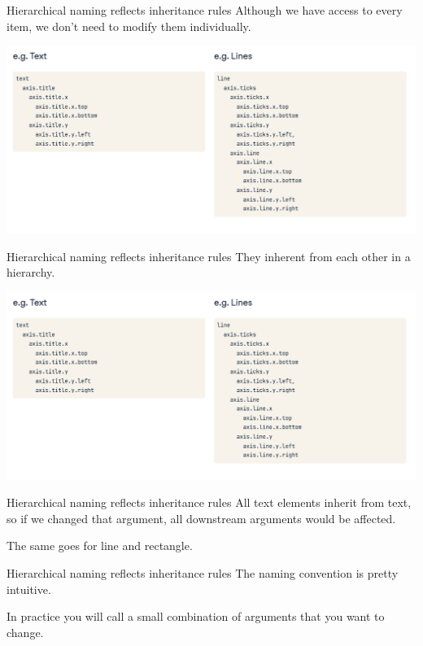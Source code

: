\documentclass[
  ignorenonframetext,
]{beamer}
\begin{document}
\begin{frame}{Hierarchical naming reflects inheritance rules}
\label{hierarchical-naming-reflects-inheritance-rules}
Although we have access to every item, we don't need to modify them
individually.

\includegraphics{../images/im215.png}
\end{frame}

\begin{frame}{Hierarchical naming reflects inheritance rules}
\label{hierarchical-naming-reflects-inheritance-rules-1}
They inherent from each other in a hierarchy.

\includegraphics{../images/im215.png}
\end{frame}

\begin{frame}{Hierarchical naming reflects inheritance rules}
\label{hierarchical-naming-reflects-inheritance-rules-2}
All text elements inherit from text, so if we changed that argument, all
downstream arguments would be affected.

The same goes for line and rectangle.
\end{frame}

\begin{frame}{Hierarchical naming reflects inheritance rules}
\label{hierarchical-naming-reflects-inheritance-rules-3}
The naming convention is pretty intuitive.

In practice you will call a small combination of arguments that you want
to change.
\end{frame}
\end{document}
